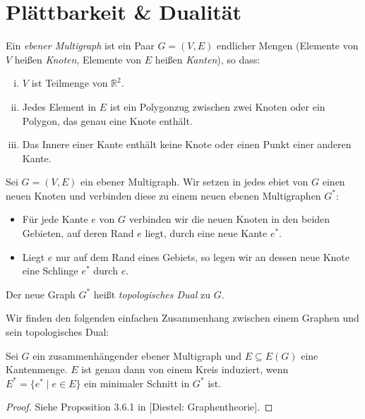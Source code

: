 \documentclass[10pt,b5paper]{article}
\begin{document}
\section{Plättbarkeit \& Dualität}

\begin{definition}
Ein \textit{ebener Multigraph} ist ein Paar $G=(V,E)$ endlicher Mengen (Elemente von $V$ heißen \textit{Knoten}, Elemente von $E$ heißen \textit{Kanten}), so dass:
\begin{enumerate}[(i)]
\item $V$ ist Teilmenge von $\mathbb{R}^2$.
\item Jedes Element in $E$ ist ein Polygonzug zwischen zwei Knoten oder ein Polygon, das genau eine Knote enthält.
\item Das Innere einer Kante enthält keine Knote oder einen Punkt einer anderen Kante.
\end{enumerate}
\end{definition}

\begin{definition}
Sei $G=(V, E)$ ein ebener Multigraph. Wir setzen in jedes ebiet von $G$ einen neuen Knoten und verbinden diese zu einem neuen ebenen Multigraphen $G^\ast$:
\begin{itemize}
\item Für jede Kante $e$ von $G$ verbinden wir die neuen Knoten in den beiden Gebieten, auf deren Rand $e$ liegt, durch eine neue Kante $e^\ast$.
\item Liegt $e$ nur auf dem Rand eines Gebiets, so legen wir an dessen neue Knote eine Schlinge $e^\ast$ durch $e$.
\end{itemize}
Der neue Graph $G^\ast$ heißt \textit{topologisches Dual} zu $G$.
\end{definition}

Wir finden den folgenden einfachen Zusammenhang zwischen einem Graphen und sein topologisches Dual:

\begin{proposition}\label{prop:kombdual-motivation}
Sei $G$ ein zusammenhängender ebener Multigraph und $E\subseteq E(G)$ eine Kantenmenge. $E$ ist genau dann von einem Kreis induziert, wenn $E^\ast = \{e^\ast\mid e\in E\}$ ein minimaler Schnitt in $G^\ast$ ist.
\end{proposition}

\begin{proof}
Siehe Proposition 3.6.1 in [Diestel: Graphentheorie].
\end{proof}
\end{document}
